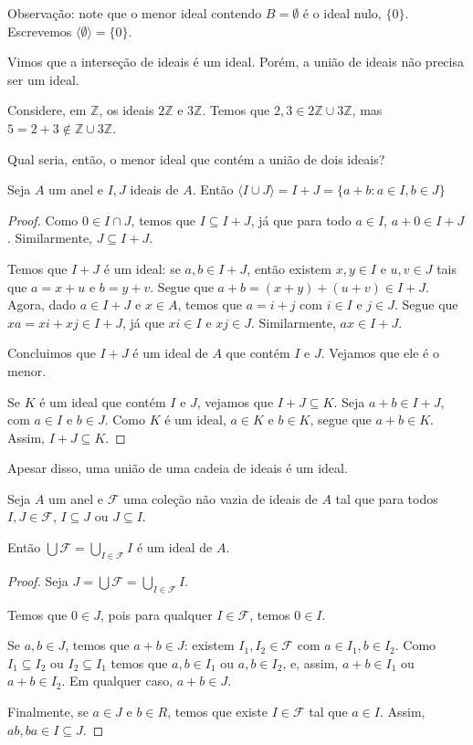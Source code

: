 Observação: note que o menor ideal contendo $B=\emptyset$ é o ideal nulo, $\{0\}$.
Escrevemos $\langle \emptyset\rangle=\{0\}$.

Vimos que a interseção de ideais é um ideal. Porém, a união de ideais não precisa ser um ideal.

\begin{exemplo} Considere, em $\mathbb Z$, os ideais $2\mathbb Z$ e $3\mathbb Z$. Temos que $2, 3 \in 2\mathbb Z\cup 3\mathbb Z$, mas $5=2+3\notin \mathbb Z\cup 3\mathbb Z$.
\end{exemplo}

Qual seria, então, o menor ideal que contém a união de dois ideais?
\begin{prop}
    Seja $A$ um anel e $I, J$ ideais de $A$. Então $\langle I\cup J\rangle=I+J=\{a+b: a \in I, b \in J\}$
\end{prop}
\begin{proof}
Como $0\in I\cap J$, temos que $I\subseteq I+J$, já que para todo $a \in I$, $a+0\in I+J$.
Similarmente, $J\subseteq I+J$.

Temos que $I+J$ é um ideal: se $a, b \in I+J$, então existem $x, y \in I$ e $u, v \in J$ tais que $a=x+u$ e $b=y+v$.
Segue que $a+b=(x+y)+(u+v)\in I+J$.
Agora, dado $a \in I+J$ e $x \in A$, temos que $a=i+j$ com $i \in I$ e $j \in J$.
Segue que $xa=xi+xj\in I+J$, já que $xi \in I$ e $xj \in J$. 
Similarmente, $ax\in I+J$.

Concluimos que $I+J$ é um ideal de $A$ que contém $I$ e $J$. Vejamos que ele é o menor.

Se $K$ é um ideal que contém $I$ e $J$, vejamos que $I+J\subseteq K$.
Seja $a+b \in I+J$, com $a \in I$ e $b \in J$.
Como $K$ é um ideal, $a \in K$ e $b \in K$, segue que $a+b \in K$.
Assim, $I+J\subseteq K$.
\end{proof}

Apesar disso, uma união de uma cadeia de ideais é um ideal.

\begin{prop}
Seja $A$ um anel e $\mathcal F$ uma coleção não vazia de ideais de $A$ tal que para todos $I, J \in \mathcal F$, $I\subseteq J$ ou $J\subseteq I$.

Então $\bigcup \mathcal F=\bigcup_{I \in \mathcal F}I$ é um ideal de $A$.
\end{prop}
\begin{proof}
    Seja $J=\bigcup \mathcal F=\bigcup_{I \in \mathcal F}I$.

    Temos que $0 \in J$, pois para qualquer $I \in \mathcal F$, temos $0 \in I$.

    Se $a, b \in J$, temos que $a+b \in J$: existem $I_1, I_2 \in \mathcal F$ com $a \in I_1, b \in I_2$.
    Como $I_1\subseteq I_2$ ou $I_2\subseteq I_1$ temos que $a, b \in I_1$ ou $a, b \in I_2$, e, assim, $a+b \in I_1$ ou $a+b \in I_2$.
    Em qualquer caso, $a+b \in J$.

    Finalmente, se $a \in J$ e $b \in R$, temos que existe $I \in \mathcal F$ tal que $a \in I$.
    Assim, $ab, ba \in I\subseteq J$.
\end{proof}
